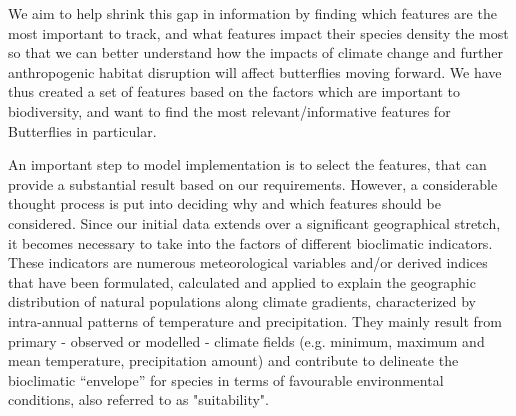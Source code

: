 \documentclass[prl,showpacs,superscriptaddress,twocolumn,longbibliography]{revtex4-1}
\begin{document}
We aim to help shrink this gap in information by finding which features are the most important to track, and what features impact their species density the most so that we can better understand how the impacts of climate change and further anthropogenic habitat disruption will affect butterflies moving forward. We have thus created a set of features based on the factors which are important to biodiversity, and want to find the most relevant/informative features for Butterflies in particular.


An important step to model implementation is to select the features, that can provide a substantial result based on our requirements. However, a considerable thought process is put into deciding why and which features should be considered. Since our initial data extends over a significant geographical stretch, it becomes necessary to take into the factors of different bioclimatic indicators. These indicators are numerous meteorological variables and/or derived indices that have been formulated, calculated and applied to explain the geographic distribution of natural populations along climate gradients,  characterized by intra-annual patterns of temperature and precipitation. They mainly result from primary - observed or modelled - climate fields (e.g. minimum, maximum and  mean  temperature,  precipitation  amount)  and  contribute  to  delineate  the  bioclimatic  “envelope” for species in terms of favourable environmental conditions, also referred to as "suitability"\cite{Noce2020}. 
\end{document}
